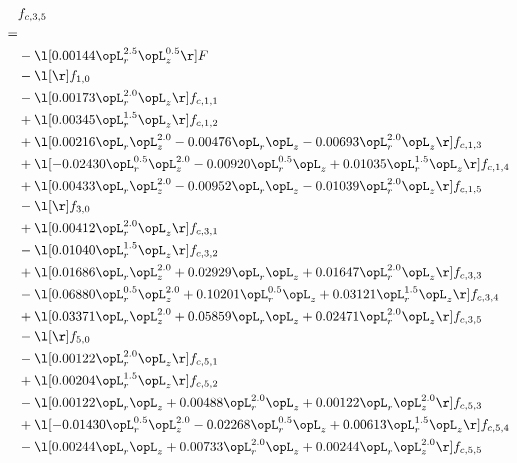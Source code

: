 \begin{alignat}{2} 
\label{eq:f_35_1} 
& f_{c,3,5} \nonumber \\ 
 = \\ 
& - \l[  0.00144 \opL_r^{2.5} \opL_z^{0.5}  \r] F \nonumber \\ 
& - \l[  \r] f_{1,0} \nonumber \\ 
& - \l[  0.00173 \opL_r^{2.0} \opL_z  \r] f_{c,1,1} \nonumber \\ 
& + \l[  0.00345 \opL_r^{1.5} \opL_z  \r] f_{c,1,2} \nonumber \\ 
& + \l[  0.00216 \opL_r \opL_z^{2.0}   -0.00476 \opL_r \opL_z   -0.00693 \opL_r^{2.0} \opL_z  \r] f_{c,1,3} \nonumber \\ 
& + \l[  -0.02430 \opL_r^{0.5} \opL_z^{2.0}   -0.00920 \opL_r^{0.5} \opL_z +  0.01035 \opL_r^{1.5} \opL_z  \r] f_{c,1,4} \nonumber \\ 
& + \l[  0.00433 \opL_r \opL_z^{2.0}   -0.00952 \opL_r \opL_z   -0.01039 \opL_r^{2.0} \opL_z  \r] f_{c,1,5} \nonumber \\ 
& - \l[  \r] f_{3,0} \nonumber \\ 
& + \l[  0.00412 \opL_r^{2.0} \opL_z  \r] f_{c,3,1} \nonumber \\ 
& - \l[  0.01040 \opL_r^{1.5} \opL_z  \r] f_{c,3,2} \nonumber \\ 
& + \l[  0.01686 \opL_r \opL_z^{2.0} +  0.02929 \opL_r \opL_z +  0.01647 \opL_r^{2.0} \opL_z  \r] f_{c,3,3} \nonumber \\ 
& - \l[  0.06880 \opL_r^{0.5} \opL_z^{2.0} +  0.10201 \opL_r^{0.5} \opL_z +  0.03121 \opL_r^{1.5} \opL_z  \r] f_{c,3,4} \nonumber \\ 
& + \l[  0.03371 \opL_r \opL_z^{2.0} +  0.05859 \opL_r \opL_z +  0.02471 \opL_r^{2.0} \opL_z  \r] f_{c,3,5} \nonumber \\ 
& - \l[  \r] f_{5,0} \nonumber \\ 
& - \l[  0.00122 \opL_r^{2.0} \opL_z  \r] f_{c,5,1} \nonumber \\ 
& + \l[  0.00204 \opL_r^{1.5} \opL_z  \r] f_{c,5,2} \nonumber \\ 
& - \l[  0.00122 \opL_r \opL_z +  0.00488 \opL_r^{2.0} \opL_z +  0.00122 \opL_r \opL_z^{2.0}  \r] f_{c,5,3} \nonumber \\ 
& + \l[  -0.01430 \opL_r^{0.5} \opL_z^{2.0}   -0.02268 \opL_r^{0.5} \opL_z +  0.00613 \opL_r^{1.5} \opL_z  \r] f_{c,5,4} \nonumber \\ 
& - \l[  0.00244 \opL_r \opL_z +  0.00733 \opL_r^{2.0} \opL_z +  0.00244 \opL_r \opL_z^{2.0}  \r] f_{c,5,5} \nonumber \\ 

\end{alignat}
